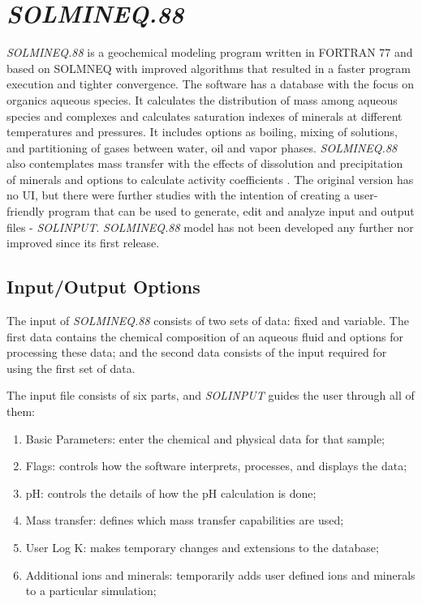 \section{\emph{SOLMINEQ.88}}
\emph{SOLMINEQ.88} is a geochemical modeling program written in FORTRAN 77 and based on SOLMNEQ \cite{Kharaka:73} with improved algorithms that resulted in a faster program execution and tighter convergence. The software has a database with the focus on organics aqueous species. It calculates the distribution of mass among aqueous species and complexes and calculates saturation indexes of minerals at different temperatures and pressures. It includes options as boiling, mixing of solutions, and partitioning of gases between water, oil and vapor phases. \emph{SOLMINEQ.88} also contemplates mass transfer with the effects of dissolution and precipitation of minerals and options to calculate activity coefficients \cite{Kharaka:88}. The original version has no UI, but there were further studies with the intention of creating a user-friendly program that can be used to generate, edit and analyze input and output files - \emph{SOLINPUT}.
\emph{SOLMINEQ.88} model has not been developed any further nor improved since its first release.

\subsection{Input/Output Options}
The input of \emph{SOLMINEQ.88} consists of two sets of data: fixed and variable. The first data contains the chemical composition of an aqueous fluid and options for processing these data; and the second data consists of the input required for using the first set of data.

The input file consists of six parts, and \emph{SOLINPUT} guides the user through all of them:
\begin{enumerate}
\item Basic Parameters: enter the chemical and physical data for that sample;
\item Flags: controls how the software interprets, processes, and displays the data;
\item pH: controls the details of how the pH calculation is done;
\item Mass transfer: defines which mass transfer capabilities are used;
\item User Log K: makes temporary changes and extensions to the database;
\item Additional ions and minerals: temporarily adds user defined ions and minerals to a particular simulation;
\end{enumerate}

